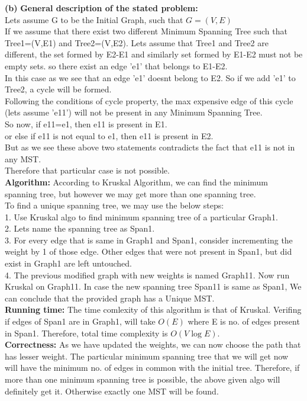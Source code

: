 \documentclass[11pt]{article}
\renewcommand\part[1]{\vspace{.10in}\textbf{(#1)}}
\newcommand\algorithm{\vspace{.10in}\textbf{Algorithm: }}
\newcommand\correctness{\vspace{.10in}\textbf{Correctness: }}
\newcommand\runtime{\vspace{.10in}\textbf{Running time: }}
\begin{document}
\part{b} {\bf General description of the stated problem:}\\[10pt]
Lets assume G to be the Initial Graph, such that $G=(V,E)$\\
If we assume that there exist two different Minimum Spanning Tree such that Tree1=(V,E1) and Tree2=(V,E2). Lets assume that Tree1 and Tree2 are different, the set formed by E2-E1 and similarly set formed by E1-E2 must not be empty sets. so there exist an edge 'e1' that belongs to E1-E2.\\
In this case as we see that an edge 'e1' doesnt belong to E2. So if we add 'e1' to Tree2, a cycle will be formed. \\
Following the conditions of cycle property, the max expensive edge of this cycle (lets assume 'e11') will not be present in any Minimum Spanning Tree.\\  
So now, if e11=e1, then e11 is present in E1.\\
or else if e11 is not equal to e1, then e11 is present in E2.\\
But as we see these above two statements contradicts the fact that e11 is not in any MST.\\
Therefore that particular case is not possible.\\

\algorithm According to Kruskal Algorithm, we can find the minimum spanning tree, but however we may get more than one spanning tree.\\
To find a unique spanning tree, we may use the below steps: \\
1. Use Kruskal algo to find minimum spanning tree of a particular Graph1.\\
2. Lets name the spanning tree as Span1.\\
3. For every edge that is same in Graph1 and Span1, consider incrementing the weight by 1 of those edge. Other edges that were not present in Span1, but did exist in Graph1 are left untouched.\\
4. The previous modified graph with new weights is named Graph11. Now run Kruskal on Graph11. In case the new spanning tree Span11 is same as Span1, We can conclude that the provided graph has a Unique MST.\\

\runtime The time comlexity of this algorithm is that of Kruskal. Verifing if edges of Span1 are in Graph1, will take $O (E)$ where E is no. of edges present in Span1. Therefore, total time complexity is $O(V \log E)$.\\
\correctness As we have updated the weights, we can now choose the path that has lesser weight. The particular minimum spanning tree that we will get now will have the minimum no. of edges in common with the initial tree. Therefore, if more than one minimum spanning tree is possible, the above given algo will definitely get it. Otherwise exactly one MST will be found.\\ [10pt]
\end{document}
